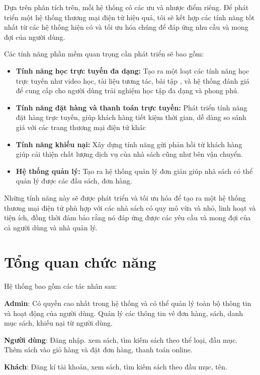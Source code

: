\documentclass[../DoAn.tex]{subfiles}
\begin{document}
Dựa trên phân tích trên, mỗi hệ thống có các ưu và nhược điểm riêng. Để phát triển một hệ thống thương mại điện tử  hiệu quả, tôi sẽ kết hợp các tính năng tốt nhất từ các hệ thống hiện có và tối ưu hóa chúng để đáp ứng nhu cầu và mong đợi của người dùng.

Các tính năng phần mềm quan trọng cần phát triển sẽ bao gồm:
\begin{itemize}
    \item \textbf{Tính năng học trực tuyến đa dạng:} Tạo ra một loạt các tính năng học trực tuyến như video học, tài liệu tương tác, bài tập , và hệ thống đánh giá để cung cấp cho người dùng trải nghiệm học tập đa dạng và phong phú.
    \item \textbf{Tính năng đặt hàng và thanh toán trực tuyến:} Phát triển tính năng đặt hàng trực tuyến, giúp khách hàng tiết kiệm thời gian, dễ dàng so sánh giá với các trang thương mại điện tử khác
    \item \textbf{Tính năng khiếu nại:} Xây dựng tính năng gửi phản hồi từ khách hàng giúp cải thiện chất lượng dịch vụ của nhà sách cũng như bên vận chuyển.
    \item \textbf{Hệ thống quản lý:} Tạo ra hệ thống quản lý đơn giản giúp nhà sách có thể quản lý được các đầu sách, đơn hàng.
\end{itemize}
Những tính năng này sẽ được phát triển và tối ưu hóa để tạo ra một hệ thống thương mại điện tử phù hợp với các nhà sách có quy mô vừa và nhỏ, linh hoạt và tiện ích, đồng thời đảm bảo rằng nó đáp ứng được các yêu cầu và mong đợi của cả người dùng và nhà quản lý.

\section{Tổng quan chức năng}
\label{section:2.2}

\label{subsection:2.2.1}

Hệ thống bao gồm các tác nhân sau:

\textbf{Admin}: Có quyền cao nhất trong hệ thống và có thể quản lý toàn bộ thông tin và hoạt động của người dùng. Quản lý các thông tin vê đơn hàng, sách, danh mục sách, khiếu nại từ người dùng.

\textbf{Người dùng}: Đăng nhập. xem sách, tìm kiếm sách theo thể loại, đầu mục. Thêm sách vào giỏ hàng và đặt đơn hàng, thanh toán online.

\textbf{Khách}: Đăng kí tài khoản, xem sách, tìm kiếm sách theo đầu mục, tên.
\end{document}

